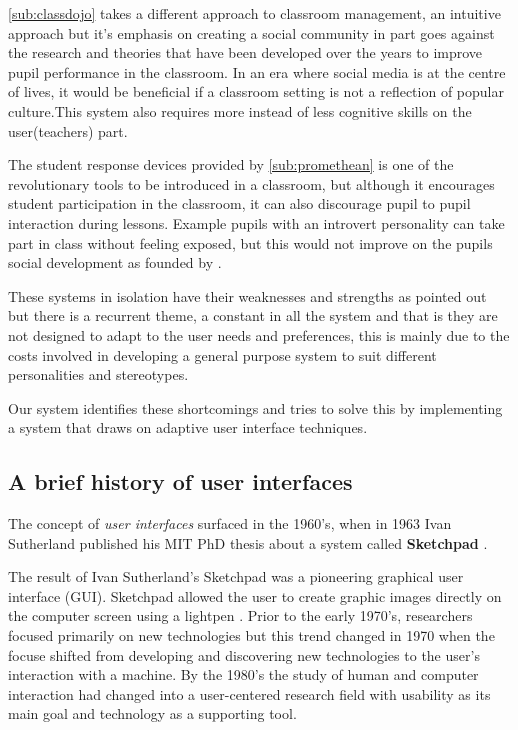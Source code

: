 \ref{sub:classdojo} takes a different approach to classroom management, an intuitive approach but it's emphasis on creating a social community in part goes against the research and theories that have been developed over the years to improve pupil performance in the classroom. In an era where social media is at the centre of lives, it would be beneficial if a classroom setting is not a reflection of popular culture.This system also requires more instead of less cognitive skills on the user(teachers) part.

The student response devices provided by \ref{sub:promethean} is one of the revolutionary tools to be introduced in a classroom, but although it encourages student participation in the classroom, it can also discourage pupil to pupil interaction during lessons. Example pupils with an introvert personality can take part in class without feeling exposed, but this would not improve on the pupils social development as founded by \cite{alexander1992curriculum}.

These systems in isolation have their weaknesses and strengths as pointed out but there is a recurrent theme, a constant in all the system and that is they are not designed to adapt to the user needs and preferences, this is mainly due to the costs involved in developing a general purpose system to suit different personalities and stereotypes.

Our system identifies these shortcomings and tries to solve this by implementing a system that draws on adaptive user interface techniques.

\subsection{A brief history of user interfaces} \label{sub:history}

The concept of \emph{user interfaces} surfaced in the 1960's, when in 1963 Ivan Sutherland published his MIT PhD thesis about a system called \textbf{Sketchpad} \cite{sutherland1964sketch}.

The result of Ivan Sutherland's Sketchpad was a pioneering graphical user interface (GUI). Sketchpad allowed the user to create graphic images directly on the computer screen using a lightpen \cite{patrick2003intelligent}.
Prior to the early 1970's, researchers focused primarily on new technologies but this trend changed in 1970 when the focuse shifted from developing and discovering new technologies to the user's interaction with a machine.
By the 1980's the study of human and computer interaction had changed into a user-centered research field with usability as its main goal and technology as a supporting tool.\cite{patrick2003intelligent}

